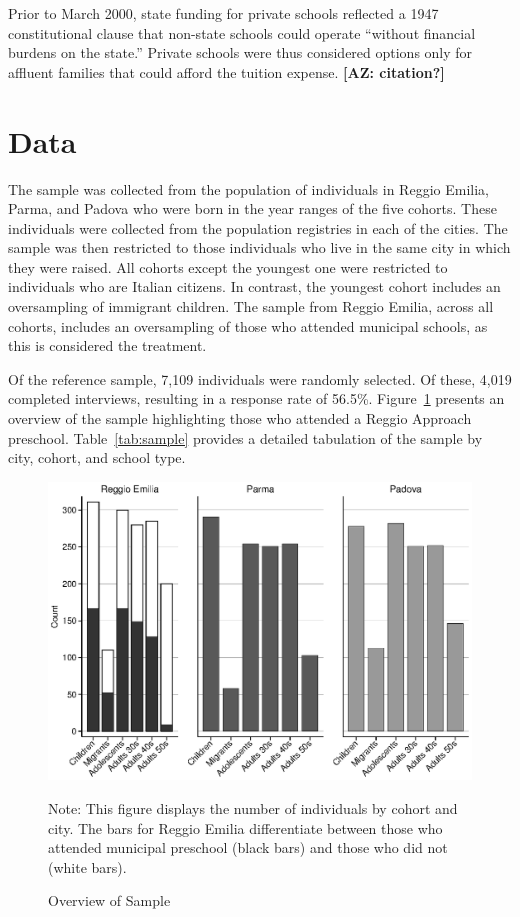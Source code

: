 Prior to March 2000, state funding for private schools reflected a 1947 constitutional clause that non-state schools could operate ``without financial burdens on the state.'' Private schools were thus considered options only for affluent families that could afford the tuition expense. \textbf{[AZ: citation?]}

\section{Data}
\label{sec:data}


The sample was collected from the population of individuals in Reggio Emilia, Parma, and Padova who were born in the year ranges of the five cohorts.  These individuals were collected from the population registries in each of the cities. The sample was then restricted to those individuals who live in the same city in which they were raised. All cohorts except the youngest one were restricted to individuals who are Italian citizens. In contrast, the youngest cohort includes an oversampling of immigrant children. The sample from Reggio Emilia, across all cohorts, includes an oversampling of those who attended municipal schools, as this is considered the treatment.

Of the reference sample, 7,109 individuals were randomly selected. Of these, 4,019 completed interviews, resulting in a response rate of 56.5\%. Figure~\ref{fig:sample} presents an overview of the sample highlighting those who attended a Reggio Approach preschool. Table~\ref{tab:sample} provides a detailed tabulation of the sample by city, cohort, and school type.

\begin{figure}[H]
\begin{center}
\caption{Overview of Sample}\label{fig:sample}
	\includegraphics[width=.9\textwidth]{output/sample.eps}
\end{center}
\raggedright
Note: This figure displays the number of individuals by cohort and city. The bars for Reggio Emilia differentiate between those who attended municipal preschool (black bars) and those who did not (white bars). 
\end{figure}


